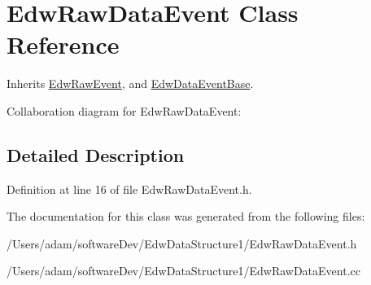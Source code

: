 \hypertarget{class_edw_raw_data_event}{
\section{EdwRawDataEvent Class Reference}
\label{class_edw_raw_data_event}
}


Inherits \hyperlink{class_edw_raw_event}{EdwRawEvent}, and \hyperlink{class_edw_data_event_base}{EdwDataEventBase}.



Collaboration diagram for EdwRawDataEvent:

\subsection{Detailed Description}


Definition at line 16 of file EdwRawDataEvent.h.



The documentation for this class was generated from the following files:\begin{DoxyCompactItemize}
\item 
/Users/adam/softwareDev/EdwDataStructure1/EdwRawDataEvent.h\item 
/Users/adam/softwareDev/EdwDataStructure1/EdwRawDataEvent.cc\end{DoxyCompactItemize}
